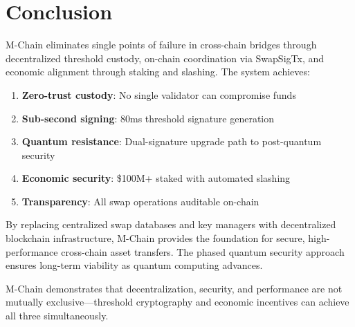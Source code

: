 \section{Conclusion}


M-Chain eliminates single points of failure in cross-chain bridges through decentralized threshold custody, on-chain coordination via SwapSigTx, and economic alignment through staking and slashing. The system achieves:

\begin{enumerate}
\item \textbf{Zero-trust custody}: No single validator can compromise funds
\item \textbf{Sub-second signing}: 80ms threshold signature generation
\item \textbf{Quantum resistance}: Dual-signature upgrade path to post-quantum security
\item \textbf{Economic security}: \$100M+ staked with automated slashing
\item \textbf{Transparency}: All swap operations auditable on-chain
\end{enumerate}

By replacing centralized swap databases and key managers with decentralized blockchain infrastructure, M-Chain provides the foundation for secure, high-performance cross-chain asset transfers. The phased quantum security approach ensures long-term viability as quantum computing advances.

M-Chain demonstrates that decentralization, security, and performance are not mutually exclusive---threshold cryptography and economic incentives can achieve all three simultaneously.

